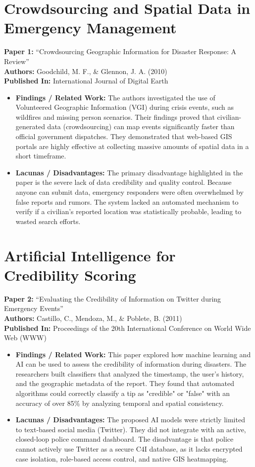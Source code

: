 \documentclass[12pt,a4paper]{report}
\begin{document}
\section{Crowdsourcing and Spatial Data in Emergency Management}
\textbf{Paper 1:} “Crowdsourcing Geographic Information for Disaster Response: A Review” \\
\textbf{Authors:} Goodchild, M. F., \& Glennon, J. A. (2010) \\
\textbf{Published In:} International Journal of Digital Earth
\begin{itemize}
    \item \textbf{Findings / Related Work:} The authors investigated the use of Volunteered Geographic Information (VGI) during crisis events, such as wildfires and missing person scenarios. Their findings proved that civilian-generated data (crowdsourcing) can map events significantly faster than official government dispatches. They demonstrated that web-based GIS portals are highly effective at collecting massive amounts of spatial data in a short timeframe.
    \item \textbf{Lacunas / Disadvantages:} The primary disadvantage highlighted in the paper is the severe lack of data credibility and quality control. Because anyone can submit data, emergency responders were often overwhelmed by false reports and rumors. The system lacked an automated mechanism to verify if a civilian’s reported location was statistically probable, leading to wasted search efforts.
\end{itemize}

\section{Artificial Intelligence for Credibility Scoring}
\textbf{Paper 2:} “Evaluating the Credibility of Information on Twitter during Emergency Events” \\
\textbf{Authors:} Castillo, C., Mendoza, M., \& Poblete, B. (2011) \\
\textbf{Published In:} Proceedings of the 20th International Conference on World Wide Web (WWW)
\begin{itemize}
    \item \textbf{Findings / Related Work:} This paper explored how machine learning and AI can be used to assess the credibility of information during disasters. The researchers built classifiers that analyzed the timestamp, the user’s history, and the geographic metadata of the report. They found that automated algorithms could correctly classify a tip as "credible" or "false" with an accuracy of over 85\% by analyzing temporal and spatial consistency.
    \item \textbf{Lacunas / Disadvantages:} The proposed AI models were strictly limited to text-based social media (Twitter). They did not integrate with an active, closed-loop police command dashboard. The disadvantage is that police cannot actively use Twitter as a secure C4I database, as it lacks encrypted case isolation, role-based access control, and native GIS heatmapping.
\end{itemize}
\end{document}
